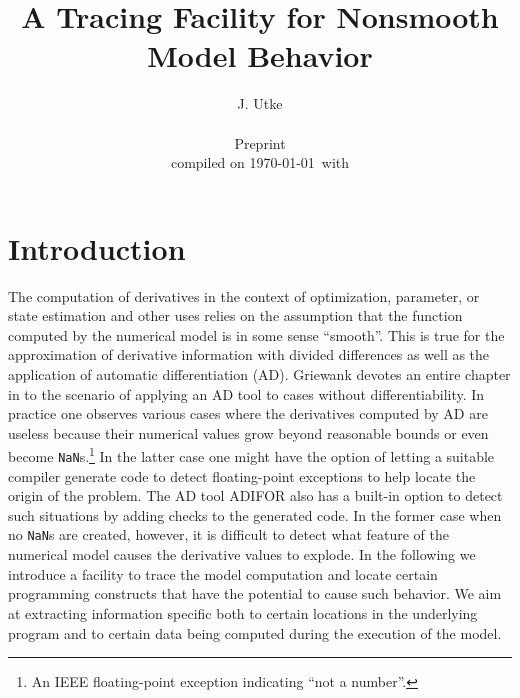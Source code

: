 \documentclass{article}
\title{A Tracing Facility for Nonsmooth Model Behavior}
\author{J. Utke\\\\
\scriptsize Preprint  \\
\scriptsize compiled on \today\ with \\
\begin{minipage}{3cm}
\tiny

\end{minipage}
}
\date{ }
\begin{document}
\maketitle
{}
\lstset{basicstyle=\small\tt, 
	numbers=left, 
	numberstyle=\scriptsize,
  	stepnumber=1, 
	numbersep=10pt, 
	breaklines=true,
	resetmargins=false,
	xleftmargin=6ex,
	columns=fullflexible}
\section{Introduction}

The computation of derivatives in the context of optimization, parameter, or state estimation 
and other uses relies on the assumption that the function computed by the numerical 
model is in some sense ``smooth''. 
This is true for the approximation of derivative information with divided differences 
as well as the application of automatic differentiation (AD). 
Griewank devotes an entire chapter in \cite{Gri00} 
to the scenario of applying an AD tool to cases without differentiability. 
In practice one observes various cases where the derivatives computed by AD are useless 
because their numerical values grow  beyond reasonable bounds \cite{tfs-delayed,tfs-chain} or even 
become \lstinline{NaN}s.\footnote{
An IEEE floating-point exception indicating ``not a number''.
} 
In the latter case one might have the option of letting a suitable compiler generate 
code to detect floating-point exceptions to help locate the origin of the problem.
The AD  tool ADIFOR \cite{adiforWeb} also has a built-in  option to detect 
such situations by adding checks to the generated code.   
In the former case when no \lstinline{NaN}s are created, however, it is difficult to 
detect what feature of the numerical model causes the derivative values to explode. 
In the following we introduce a facility to trace the model computation and locate 
certain programming constructs that have the potential to cause 
such behavior. We aim at extracting information specific both  to 
certain locations in the underlying program and to certain data 
being computed during the execution of the model.  
   
\end{document}
